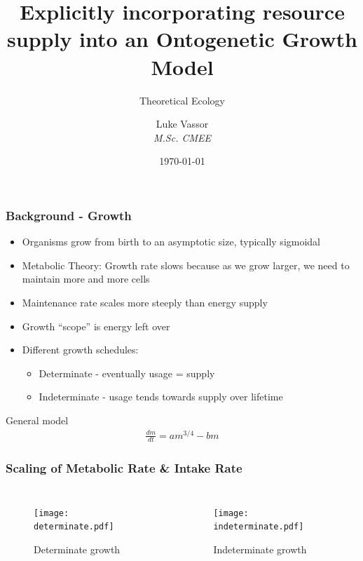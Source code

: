 \documentclass[handout]{beamer}
\institute{\texttt{[image: Imperial\_1\_Pantone\_solid.pdf]}}
\title{Explicitly incorporating resource supply into an Ontogenetic Growth Model}
\subtitle{Theoretical Ecology}
\author{Luke Vassor \\ \textit{M.Sc. CMEE}}
\date{\today}
\begin{document}
 
\frame{\titlepage}


\begin{frame}
	\frametitle{Background - Growth}
	\begin{itemize}
		\item Organisms grow from birth to an asymptotic size, typically sigmoidal
		\item Metabolic Theory: Growth rate slows because as we grow larger, we need to maintain more and more cells
		\item Maintenance rate scales more steeply than energy supply
		\item Growth ``scope'' is energy left over
		\item Different growth schedules:
		\begin{itemize}
			\item Determinate - eventually usage = supply
			\item Indeterminate - usage tends towards supply over lifetime
		\end{itemize}
	\end{itemize}

			

	\begin{block}{General model}
		\begin{align*}
			\frac{dm}{dt} = am^{3/4} - bm
		\end{align*}
	\end{block}
\end{frame}


\begin{frame}
	\frametitle{Scaling of Metabolic Rate \& Intake Rate}
	\begin{columns}[b]
			\centering
			\begin{figure}
				\texttt{[image: determinate.pdf]} \
				\caption{Determinate growth}
			\end{figure}
			\centering
			\begin{figure}
				\texttt{[image: indeterminate.pdf]} \
				\caption{Indeterminate growth}
			\end{figure}
	\end{columns}
\end{frame}
\end{document}
